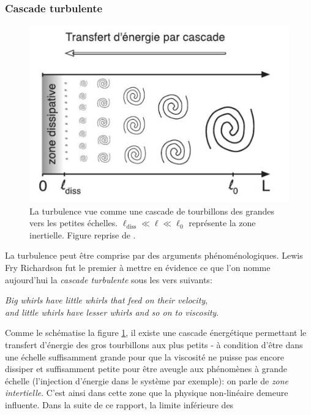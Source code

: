 \documentclass[13pt, a4paper]{extarticle}
\begin{document}
\subsubsection{Cascade turbulente}\label{sec:cascade}
\begin{figure}[h]
    \centering
    \includegraphics[width=.9\linewidth]{figs/cascade_tourbillons.png}
    \caption[La turbulence vue comme une cascade de tourbillons des grandes vers les petites échelles]
    {La turbulence vue comme une cascade de tourbillons des grandes vers les petites échelles. 
    $\ell_\text{diss}\ll\ell\ll\ell_0$ représente la zone inertielle. Figure reprise de \cite{Galtier-Turb}.}
    \label{fig:cascade_tourb}
\end{figure}
\noindent La turbulence peut être comprise par des arguments phénoménologiques. Lewis Fry 
Richardson fut le premier à mettre en évidence ce que l'on nomme aujourd'hui la \emph{cascade 
turbulente} sous les vers suivants:
\begin{center}
    \emph{Big whirls have little whirls that feed on their velocity},\\
    \emph{and little whirls have lesser whirls and so on to viscosity}.
\end{center}
Comme le schématise la figure \ref{fig:cascade_tourb}, il existe une cascade énergétique 
permettant le transfert d'énergie des gros tourbillons aux plus petits - à condition d'être dans 
une échelle suffisamment grande pour que la viscosité ne puisse pas encore dissiper et 
suffisamment petite pour être aveugle aux phénomènes à grande échelle (l'injection d'énergie dans
le système par exemple): on parle de \emph{zone intertielle}. C'est ainsi dans cette zone que la 
physique non-linéaire demeure influente. Dans la suite de ce rapport, la limite inférieure des 
\end{document}
